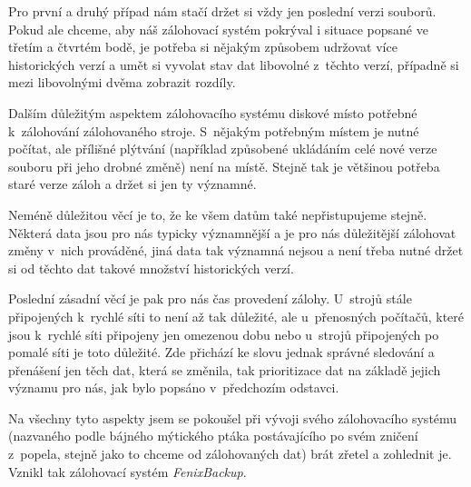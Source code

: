 Pro první a druhý případ nám stačí držet si vždy jen poslední verzi souborů.
Pokud ale chceme, aby náš zálohovací systém pokrýval i situace popsané ve třetím
a čtvrtém bodě, je potřeba si nějakým způsobem udržovat více historických verzí
a umět si vyvolat stav dat libovolné z~těchto verzí, případně si mezi libovolnými
dvěma zobrazit rozdíly.

Dalším důležitým aspektem zálohovacího systému diskové místo potřebné
k~zálohování zálohovaného stroje. S~nějakým potřebným místem je nutné počítat, ale
přílišné plýtvání (například způsobené ukládáním celé nové verze souboru při
jeho drobné změně) není na místě. Stejně tak je většinou potřeba 
staré verze záloh a držet si jen ty významné.

Neméně důležitou věcí je to, že ke všem datům také nepřistupujeme stejně. Některá
data jsou pro nás typicky významnější a je pro nás důležitější zálohovat změny
v~nich prováděné, jiná data tak významná nejsou a není třeba nutné držet si od
těchto dat takové množství historických verzí.

Poslední zásadní věcí je pak pro nás čas provedení zálohy. U~strojů stále
připojených k~rychlé síti to není až tak důležité, ale u~přenosných počítačů,
které jsou k~rychlé síti připojeny jen omezenou dobu nebo u~strojů připojených
po pomalé síti je toto důležité. Zde přichází ke slovu jednak správné sledování
a přenášení jen těch dat, která se změnila, tak prioritizace dat na základě
jejich významu pro nás, jak bylo popsáno v~předchozím odstavci.

Na všechny tyto aspekty jsem se pokoušel při vývoji svého zálohovacího systému
(nazvaného podle bájného mýtického ptáka postávajícího po svém zničení z~popela,
stejně jako to chceme od zálohovaných dat) brát zřetel a zohlednit je. Vznikl
tak zálohovací systém {\it FenixBackup}.
